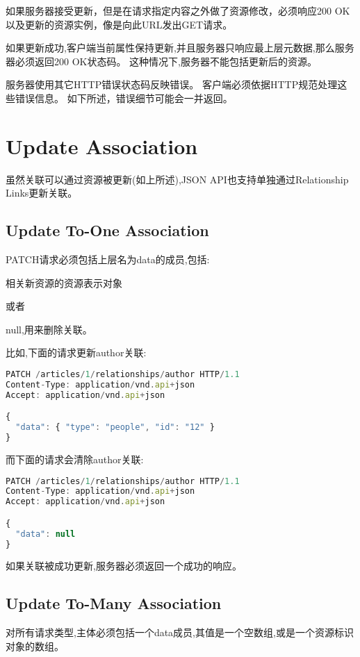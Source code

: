 如果服务器接受更新，但是在请求指定内容之外做了资源修改，必须响应200 OK以及更新的资源实例，像是向此URL发出GET请求。

如果更新成功,客户端当前属性保持更新,并且服务器只响应最上层元数据,那么服务器必须返回200 OK状态码。 这种情况下,服务器不能包括更新后的资源。

服务器使用其它HTTP错误状态码反映错误。 客户端必须依据HTTP规范处理这些错误信息。 如下所述，错误细节可能会一并返回。

\section{Update Association}

虽然关联可以通过资源被更新(如上所述),JSON API也支持单独通过Relationship Links更新关联。

\subsection{Update To-One Association}

PATCH请求必须包括上层名为data的成员,包括:

相关新资源的资源表示对象

或者

null,用来删除关联。

比如,下面的请求更新author关联:


\begin{lstlisting}[language=JavaScript]
PATCH /articles/1/relationships/author HTTP/1.1
Content-Type: application/vnd.api+json
Accept: application/vnd.api+json

{
  "data": { "type": "people", "id": "12" }
}
\end{lstlisting}


而下面的请求会清除author关联:

\begin{lstlisting}[language=JavaScript]
PATCH /articles/1/relationships/author HTTP/1.1
Content-Type: application/vnd.api+json
Accept: application/vnd.api+json

{
  "data": null
}
\end{lstlisting}


如果关联被成功更新,服务器必须返回一个成功的响应。

\subsection{Update To-Many Association}

对所有请求类型,主体必须包括一个data成员,其值是一个空数组,或是一个资源标识对象的数组。


